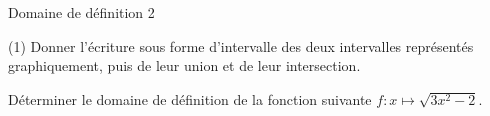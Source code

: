 \documentclass{beamer}
\begin{document}
\begin{frame}{Domaine de définition 2}

	\begin{tasks}(1)
		\task Donner l'écriture sous forme d'intervalle des deux intervalles représentés graphiquement, puis de leur union et de leur intersection. 

\medskip
{}
		\task  
	Déterminer le domaine de définition de la fonction suivante $f:x\mapsto {\sqrt{3x^2-2}}$.
	\end{tasks}
\end{frame}
\end{document}
